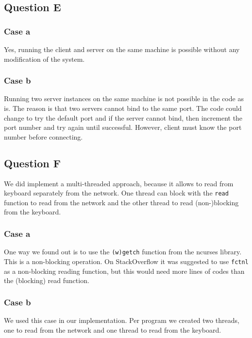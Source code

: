 \documentclass[11pt]{article}
\begin{document}
\subsection{Question E}
\subsubsection{Case a}
Yes, running the client and server on the same machine is possible without any modification of the system.
\subsubsection{Case b}
Running two server instances on the same machine is not possible in the code as is. The reason is that two servers cannot bind to the same port. The code could change to try the default port and if the server cannot bind, then increment the port number and try again until successful. However, client must know the port number before connecting.
\subsection{Question F}
We did implement a multi-threaded approach, because it allows to read from keyboard separately from the network. One thread can block with the \texttt{read} function to read from the network and the other thread to read (non-)blocking from the keyboard.
\subsubsection{Case a}
One way we found out is to use the \texttt{(w)getch} function from the ncurses library. This is a non-blocking operation. On StackOverflow it was suggested to use \texttt{fctnl} as a non-blocking reading function, but this would need more lines of codes than the (blocking) read function.
\subsubsection{Case b}
We used this case in our implementation. Per program we created two threads, one to read from the network and one thread to read from the keyboard.
\end{document}
